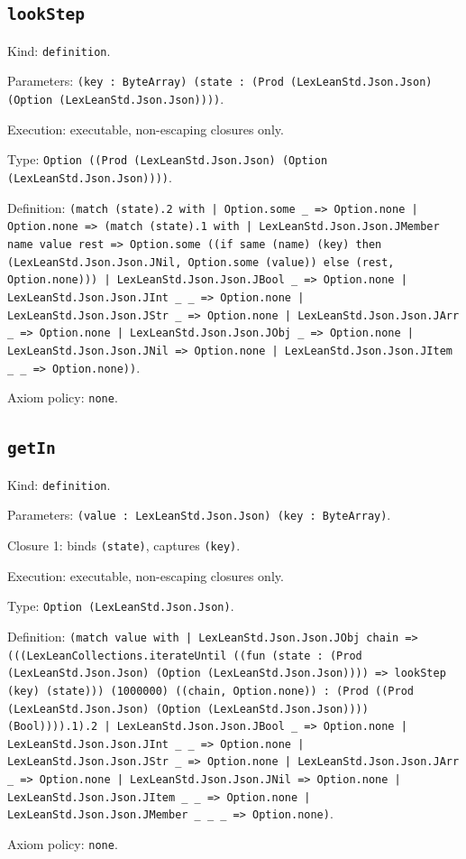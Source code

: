 \documentclass[11pt]{article}
\begin{document}
\subsection*{\texttt{lookStep}}
\noindent Kind: \texttt{definition}.\par
\noindent Parameters: \texttt{(key : ByteArray) (state : (Prod (LexLeanStd.Json.Json) (Option (LexLeanStd.Json.Json))))}.\par
\noindent Execution: executable, non-escaping closures only.\par
\noindent Type: \texttt{Option ((Prod (LexLeanStd.Json.Json) (Option (LexLeanStd.Json.Json))))}.\par
\noindent Definition: \texttt{(match (state).2 with | Option.some \_ => Option.none | Option.none => (match (state).1 with | LexLeanStd.Json.Json.JMember name value rest => Option.some ((if same (name) (key) then (LexLeanStd.Json.Json.JNil, Option.some (value)) else (rest, Option.none))) | LexLeanStd.Json.Json.JBool \_ => Option.none | LexLeanStd.Json.Json.JInt \_ \_ => Option.none | LexLeanStd.Json.Json.JStr \_ => Option.none | LexLeanStd.Json.Json.JArr \_ => Option.none | LexLeanStd.Json.Json.JObj \_ => Option.none | LexLeanStd.Json.Json.JNil => Option.none | LexLeanStd.Json.Json.JItem \_ \_ => Option.none))}.\par
\noindent Axiom policy: \texttt{none}.\par
\subsection*{\texttt{getIn}}
\noindent Kind: \texttt{definition}.\par
\noindent Parameters: \texttt{(value : LexLeanStd.Json.Json) (key : ByteArray)}.\par
\noindent Closure 1: binds \texttt{(state)}, captures \texttt{(key)}.\par
\noindent Execution: executable, non-escaping closures only.\par
\noindent Type: \texttt{Option (LexLeanStd.Json.Json)}.\par
\noindent Definition: \texttt{(match value with | LexLeanStd.Json.Json.JObj chain => (((LexLeanCollections.iterateUntil ((fun (state : (Prod (LexLeanStd.Json.Json) (Option (LexLeanStd.Json.Json)))) => lookStep (key) (state))) (1000000) ((chain, Option.none)) : (Prod ((Prod (LexLeanStd.Json.Json) (Option (LexLeanStd.Json.Json)))) (Bool)))).1).2 | LexLeanStd.Json.Json.JBool \_ => Option.none | LexLeanStd.Json.Json.JInt \_ \_ => Option.none | LexLeanStd.Json.Json.JStr \_ => Option.none | LexLeanStd.Json.Json.JArr \_ => Option.none | LexLeanStd.Json.Json.JNil => Option.none | LexLeanStd.Json.Json.JItem \_ \_ => Option.none | LexLeanStd.Json.Json.JMember \_ \_ \_ => Option.none)}.\par
\noindent Axiom policy: \texttt{none}.\par
\end{document}

